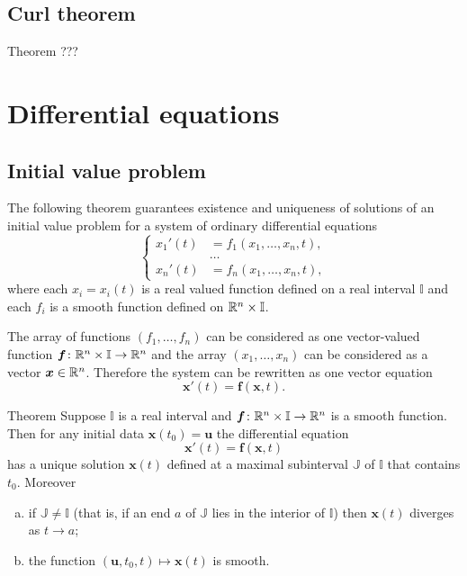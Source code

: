 \section{Curl theorem}

\begin{thm}{Theorem}\label{thm:curl}
???
\end{thm}



\chapter{Differential equations}

\section{Initial value problem}

The following theorem guarantees existence and uniqueness of solutions of an initial value problem
for a system of ordinary differential equations
\[
\begin{cases}
x_1'(t)&=f_1(x_1,\dots,x_n,t),
\\
&\dots
\\
x_n'(t)&=f_n(x_1,\dots,x_n,t),
\end{cases}
\]
where each $x_i=x_i(t)$ is a real valued function defined on a real interval $\mathbb{I}$
and each $f_i$ is a smooth function defined on $\mathbb{R}^n\times \mathbb{I}$.

The array of functions $(f_1,\dots,f_n)$ can be considered as one vector-valued function 
$\bm{f}\colon\mathbb{R}^n\times \mathbb{I}\to \mathbb{R}^n$ and the array $(x_1,\dots,x_n)$ can be considered as a vector  $\bm{x}\in\mathbb{R}^n$.
Therefore the system can be rewritten as one vector equation 
\[\bm{x}'(t)=\bm{f}(\bm{x}, t).\] 

\begin{thm}{Theorem}\label{thm:ODE}
Suppose $\mathbb{I}$ is a real interval and $\bm{f}\colon\mathbb{R}^n\times\mathbb{I}\to \mathbb{R}^n$ is a smooth function.
Then for any initial data $\bm{x}(t_0)=\bm{u}$ the differential equation 
\[\bm{x}'(t)=\bm{f}(\bm{x},t)\]
has a unique solution $\bm{x}(t)$ defined at a maximal subinterval $\mathbb{J}$ of $\mathbb{I}$ that contains $t_0$.
Moreover
\begin{enumerate}[(a)]
\item  if $\mathbb{J}\ne \mathbb{I}$ (that is, if an end $a$ of $\mathbb{J}$ lies in the interior of $\mathbb{I}$) then $\bm{x}(t)$ diverges as $t\to a$;
\item  the function $(\bm{u},t_0,t)\mapsto \bm{x}(t)$ is smooth.
\end{enumerate}


\end{thm}

